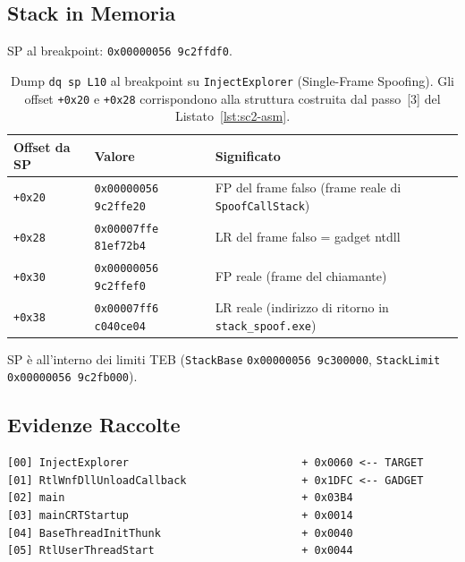 

\subsection{Stack in Memoria}

SP al breakpoint: \texttt{0x00000056\,9c2ffdf0}.

\begin{table}[H]
\centering
\begin{tabular}{lll}
\toprule
Offset da SP & Valore & Significato \\
\midrule
\texttt{+0x20} & \texttt{0x00000056\,9c2ffe20} & FP del frame falso (frame reale di \texttt{SpoofCallStack}) \\
\texttt{+0x28} & \texttt{0x00007ffe\,81ef72b4} & LR del frame falso = gadget ntdll \\
\texttt{+0x30} & \texttt{0x00000056\,9c2ffef0} & FP reale (frame del chiamante) \\
\texttt{+0x38} & \texttt{0x00007ff6\,c040ce04} & LR reale (indirizzo di ritorno in \texttt{stack\_spoof.exe}) \\
\bottomrule
\end{tabular}
\caption{Dump \texttt{dq sp L10} al breakpoint su \texttt{InjectExplorer}
         (Single-Frame Spoofing). Gli offset \texttt{+0x20} e
         \texttt{+0x28} corrispondono alla struttura costruita dal passo~[3]
         del Listato~\ref{lst:sc2-asm}.}
\label{tab:sc2-stack}
\end{table}

{\sloppy SP è all'interno dei limiti TEB
(\texttt{StackBase} \texttt{0x00000056\,9c300000},
\texttt{StackLimit} \texttt{0x00000056\,9c2fb000}).\par}

\subsection{Evidenze Raccolte}

\begin{lstlisting}[style=outstyle,
  caption={\texttt{CaptureStackBackTrace} dall'interno di \texttt{InjectExplorer}
           (Single-Frame Spoofing, dati da console)},
  label={lst:sc2-cbt}]
[00] InjectExplorer                           + 0x0060 <-- TARGET
[01] RtlWnfDllUnloadCallback                  + 0x1DFC <-- GADGET
[02] main                                     + 0x03B4
[03] mainCRTStartup                           + 0x0014
[04] BaseThreadInitThunk                      + 0x0040
[05] RtlUserThreadStart                       + 0x0044
\end{lstlisting}

